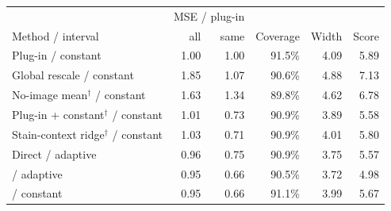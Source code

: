 
\begin{tabular}{@{}lrrrrr@{}}
\toprule
& \multicolumn{2}{c}{MSE / plug-in} & & & \\
Method / interval & all & same & Coverage & Width & Score \\
\midrule
Plug-in / constant & 1.00 & 1.00 & 91.5\% & 4.09 & 5.89 \\
Global rescale / constant & 1.85 & 1.07 & 90.6\% & 4.88 & 7.13 \\
No-image mean$^\dagger$ / constant & 1.63 & 1.34 & 89.8\% & 4.62 & 6.78 \\
Plug-in + constant$^\dagger$ / constant & 1.01 & 0.73 & 90.9\% & 3.89 & 5.58 \\
Stain-context ridge$^\dagger$ / constant & 1.03 & 0.71 & 90.9\% & 4.01 & 5.80 \\
Direct / adaptive & 0.96 & 0.75 & 90.9\% & 3.75 & 5.57 \\
\method{} / adaptive & 0.95 & 0.66 & 90.5\% & 3.72 & 4.98 \\
\method{} / constant & 0.95 & 0.66 & 91.1\% & 3.99 & 5.67 \\
\bottomrule
\end{tabular}
